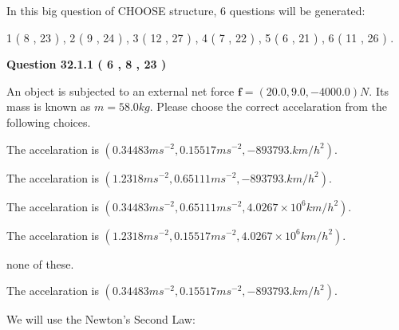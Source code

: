\documentclass[12pt]{article}
\begin{document}
   
\vspace{0.2in}
   
 In this big question of CHOOSE structure,            6  questions will be generated: 
  
  
             1 (           8 ,          23 )
 ,
             2 (           9 ,          24 )
 ,
             3 (          12 ,          27 )
 ,
             4 (           7 ,          22 )
 ,
             5 (           6 ,          21 )
 ,
             6 (          11 ,          26 )
 .
  
\vspace{0.2in}
  
{\textbf{\Large{Question
32.1.1 
 (           6 ,           8 ,          23 )
}}}
  
  
 
An object is subjected to an external net force $\mathbf{f}=(
20.0 ,
9.0,
-4000.0  )N$. Its mass is known as
$m= %
58.0  kg$. Please choose the correct accelaration
from the following choices.
 
 
 
The accelaration is
$(
0.34483ms^{-2},
0.15517ms^{-2},
-893793.km/h^2
).
$
 
 
The accelaration is
$(
1.2318ms^{-2},
0.65111ms^{-2},
-893793.km/h^2
).
$
 
 
The accelaration is
$(
0.34483ms^{-2},
0.65111ms^{-2},
4.0267 \times 10^{6}km/h^2
).
$
 
 
The accelaration is
$(
1.2318ms^{-2},
0.15517ms^{-2},
4.0267 \times 10^{6}km/h^2
).
$
 
 
none of these.
 
 
\noindent{}
 
 
The accelaration is
$(
0.34483ms^{-2},
0.15517ms^{-2},
-893793.km/h^2
).
$
 
 
\noindent{}
 
 
 
 
 
 
\noindent{}
 
 

We will use the Newton's Second Law:
 
\end{document}
